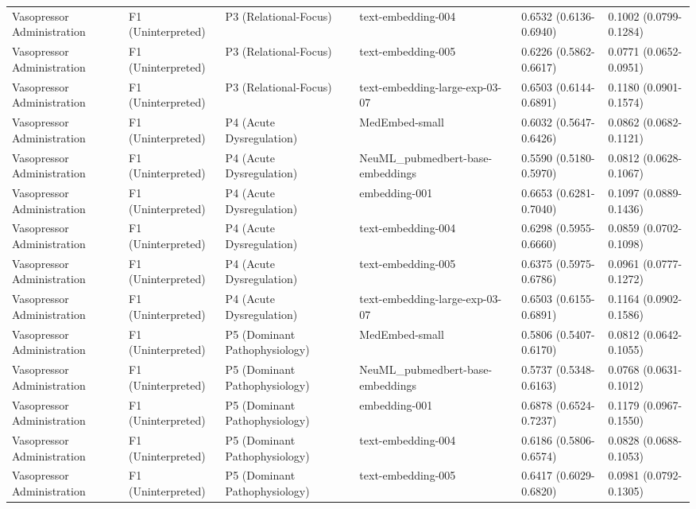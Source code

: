 \documentclass[border=0pt]{standalone}
\begin{document}
\begin{adjustbox}{width=\textwidth}
\begin{tabular}{llllll}
Vasopressor Administration & F1 (Uninterpreted) & P3 (Relational-Focus) & text-embedding-004 & 0.6532 (0.6136-0.6940) & 0.1002 (0.0799-0.1284) \\
Vasopressor Administration & F1 (Uninterpreted) & P3 (Relational-Focus) & text-embedding-005 & 0.6226 (0.5862-0.6617) & 0.0771 (0.0652-0.0951) \\
Vasopressor Administration & F1 (Uninterpreted) & P3 (Relational-Focus) & text-embedding-large-exp-03-07 & 0.6503 (0.6144-0.6891) & 0.1180 (0.0901-0.1574) \\
Vasopressor Administration & F1 (Uninterpreted) & P4 (Acute Dysregulation) & MedEmbed-small & 0.6032 (0.5647-0.6426) & 0.0862 (0.0682-0.1121) \\
Vasopressor Administration & F1 (Uninterpreted) & P4 (Acute Dysregulation) & NeuML\_pubmedbert-base-embeddings & 0.5590 (0.5180-0.5970) & 0.0812 (0.0628-0.1067) \\
Vasopressor Administration & F1 (Uninterpreted) & P4 (Acute Dysregulation) & embedding-001 & 0.6653 (0.6281-0.7040) & 0.1097 (0.0889-0.1436) \\
Vasopressor Administration & F1 (Uninterpreted) & P4 (Acute Dysregulation) & text-embedding-004 & 0.6298 (0.5955-0.6660) & 0.0859 (0.0702-0.1098) \\
Vasopressor Administration & F1 (Uninterpreted) & P4 (Acute Dysregulation) & text-embedding-005 & 0.6375 (0.5975-0.6786) & 0.0961 (0.0777-0.1272) \\
Vasopressor Administration & F1 (Uninterpreted) & P4 (Acute Dysregulation) & text-embedding-large-exp-03-07 & 0.6503 (0.6155-0.6891) & 0.1164 (0.0902-0.1586) \\
Vasopressor Administration & F1 (Uninterpreted) & P5 (Dominant Pathophysiology) & MedEmbed-small & 0.5806 (0.5407-0.6170) & 0.0812 (0.0642-0.1055) \\
Vasopressor Administration & F1 (Uninterpreted) & P5 (Dominant Pathophysiology) & NeuML\_pubmedbert-base-embeddings & 0.5737 (0.5348-0.6163) & 0.0768 (0.0631-0.1012) \\
Vasopressor Administration & F1 (Uninterpreted) & P5 (Dominant Pathophysiology) & embedding-001 & 0.6878 (0.6524-0.7237) & 0.1179 (0.0967-0.1550) \\
Vasopressor Administration & F1 (Uninterpreted) & P5 (Dominant Pathophysiology) & text-embedding-004 & 0.6186 (0.5806-0.6574) & 0.0828 (0.0688-0.1053) \\
Vasopressor Administration & F1 (Uninterpreted) & P5 (Dominant Pathophysiology) & text-embedding-005 & 0.6417 (0.6029-0.6820) & 0.0981 (0.0792-0.1305) \\

\end{tabular}
\end{adjustbox}
\end{document}
